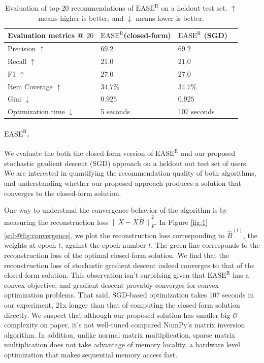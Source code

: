 \documentclass{article}
\newcommand{\easer}{$\text{EASE}^\text{R}$\xspace}
\newcommand{\norm}[1]{\ensuremath{\lVert #1 \rVert}}
\begin{document}
\begin{table}[h]
	\centering
	\begin{tabular}{@{}llll@{}}
		\toprule
		Evaluation metrics @ $20$     & \easer (closed-form) & \easer
		(SGD)
		\\ \midrule
		Precision $\uparrow$          & $69.2$               & $69.2$
		\\
		Recall	$\uparrow$              & $21.0$               &
		$21.0$
		\\
		F1	$\uparrow$                  & $27.0$               &
		$27.0$
		\\
		Item Coverage	$\uparrow$       & $34.7\%$             &
		$34.7\%$
		\\
		Gini	$\downarrow$              & $0.925$              &
		$0.925$
		\\
		Optimization time	$\downarrow$ & 5 seconds
		                              & 107 seconds
		\\ \bottomrule
	\end{tabular}
	\caption{Evaluation of top-20 recommendations of \easer on a heldout
		test set. $\uparrow$ means higher is better, and $\downarrow$
		means
		lower is better.}
	\label{tab:easer-results}

\end{table}

\paragraph*{\easer.}
We evaluate the both the closed-form version of \easer and our proposed
 stochastic gradient descent (SGD) approach on a heldout out test set of users.
We are interested in quantifying the recommendation quality of both algorithms,
 and understanding whether our proposed approach produces a solution that
 converges to the closed-form solution.

One way to understand the convergence behavior of the algorithm is by measuring
 the reconstruction loss $\norm{X - X \hat{B}}_F^2$.
In Figure \ref{fig:1}\ref{sub@fig:convergence}, we plot the reconstruction loss
 corresponding to $\hat{B}^{(t)}$, the weights at epoch $t$, against the epoch
 number $t$.
The green line corresponds to the reconstruction loss of the optimal
 closed-form solution.
We find that the reconstruction loss of stochastic gradient descent indeed
 converges to that of the closed-form solution.
This observation isn't surprising given that \easer has a convex objective, and
 gradient descent provably converges for convex optimization problems.
That said, SGD-based optimization takes 107 seconds in our experiment, 21x
 longer than that of computing the closed-form solution directly.
We suspect that although our proposed solution has smaller big-$\mathcal{O}$
 complexity on paper, it's not well-tuned compared  NumPy's matrix inversion
 algorithm.
In addition, unlike normal matrix multiplication, sparse matrix multiplication
 does not take advantage of memory locality, a hardware level optimization that
 makes sequential memory access fast.
\end{document}

